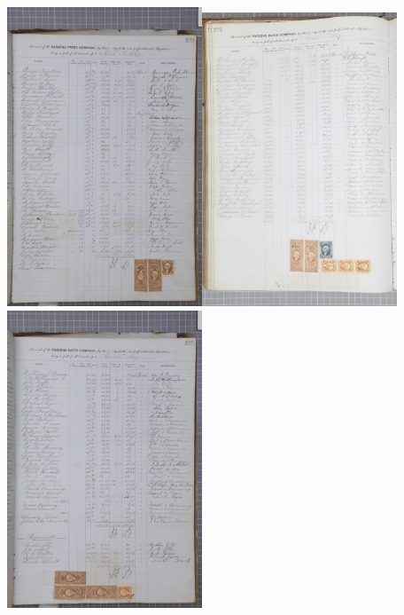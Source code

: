 \documentclass[
  letterpaper,
  DIV=11,
  numbers=noendperiod]{scrartcl}
\begin{document}
\begin{itemize}
  \includegraphics[width=2.29167in,height=\textheight]{images/Screenshot 2023-02-13 at 4.14.02 PM.png}\includegraphics[width=2.29167in,height=\textheight]{images/Screenshot 2023-02-13 at 4.14.09 PM-01.png}\includegraphics[width=2.29167in,height=\textheight]{images/Screenshot 2023-02-13 at 4.14.16 PM.png}
\end{itemize}
\end{document}
